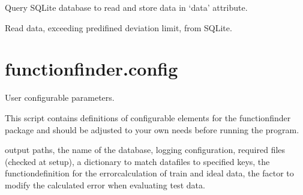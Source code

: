 \documentclass[letterpaper,10pt,english]{sphinxmanual}
\begin{document}
\begin{fulllineitems}
\begin{fulllineitems}
\label{\detokenize{_autosummary/functionfinder.classes.testdata:functionfinder.classes.testdata.getdata}}
\pysigstartsignatures
{}
\pysigstopsignatures
\sphinxAtStartPar
Query SQLite database to read and store data in ‘data’ attribute.

\end{fulllineitems}


\begin{fulllineitems}
\label{\detokenize{_autosummary/functionfinder.classes.testdata:functionfinder.classes.testdata.off_limit}}
\pysigstartsignatures
{}
\pysigstopsignatures
\sphinxAtStartPar
Read data, exceeding predifined deviation limit, from SQLite.

\end{fulllineitems}


\end{fulllineitems}


\sphinxstepscope


\section{functionfinder.config}
\label{\detokenize{_autosummary/functionfinder.config:module-functionfinder.config}}\label{\detokenize{_autosummary/functionfinder.config:functionfinder-config}}\label{\detokenize{_autosummary/functionfinder.config::doc}}
\sphinxAtStartPar
User configurable parameters.

\sphinxAtStartPar
This script contains definitions of configurable elements for the
functionfinder package and should be adjusted to your own needs before running
the program.
\begin{description}
\sphinxAtStartPar
output paths,
the name of the database,
logging configuration,
required files (checked at setup),
a dictionary to match datafiles to specified keys,
the functiondefinition for the errorcalculation of train and ideal data,
the factor to modify the calculated error when evaluating test data.

\end{description}
\end{document}
